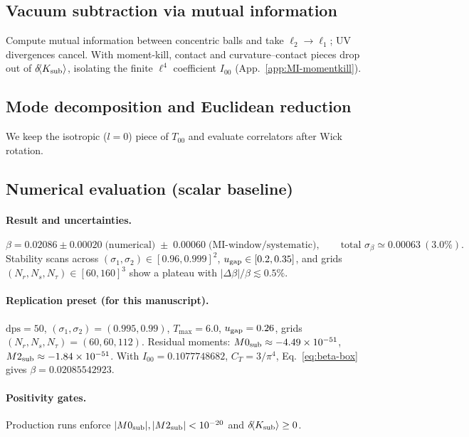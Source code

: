 \documentclass[aps,prd,onecolumn,superscriptaddress,nofootinbib]{revtex4-2}
\begin{document}
\subsection{Vacuum subtraction via mutual information}
Compute mutual information between concentric balls and take \(\ell_2\!\to\!\ell_1\); UV divergences cancel. With moment-kill, contact and curvature–contact pieces drop out of \(\delta\!\langle K_{\rm sub}\rangle\), isolating the finite \(\ell^4\) coefficient \(I_{00}\) (App.~\ref{app:MI-momentkill}).

\subsection{Mode decomposition and Euclidean reduction}
We keep the isotropic (\(l=0\)) piece of \(T_{00}\) and evaluate correlators after Wick rotation.

\subsection{Numerical evaluation (scalar baseline)}
\paragraph*{Result and uncertainties.}
\begin{equation}
\beta = 0.02086 \pm 0.00020\;\text{(numerical)} \;\pm\; 0.00060\;\text{(MI-window/systematic)},\qquad \text{total }\sigma_\beta \simeq 0.00063~(3.0\%).
\end{equation}
Stability scans across \((\sigma_1,\sigma_2)\in[0.96,0.999]^2\), \(u_{\rm gap}\in[0.2,0.35]\), and grids \((N_r,N_s,N_\tau)\in[60,160]^3\) show a plateau with \(|\Delta\beta|/\beta \lesssim 0.5\%\).

\paragraph*{Replication preset (for this manuscript).}
\(\mathrm{dps}=50\), \((\sigma_1,\sigma_2)=(0.995,0.99)\), \(T_{\max}=6.0\), \(u_{\rm gap}=0.26\), grids \((N_r,N_s,N_\tau)=(60,60,112)\). Residual moments: \(M0_{\rm sub}\approx-4.49\times 10^{-51}\), \(M2_{\rm sub}\approx-1.84\times 10^{-51}\). With \(I_{00}=0.1077748682\), \(C_T=3/\pi^4\), Eq.~\eqref{eq:beta-box} gives \(\beta=0.02085542923\).

\paragraph*{Positivity gates.}
Production runs enforce \(|M0_{\rm sub}|,|M2_{\rm sub}|<10^{-20}\) and \(\delta\!\langle K_{\rm sub}\rangle \ge 0\).
\end{document}
